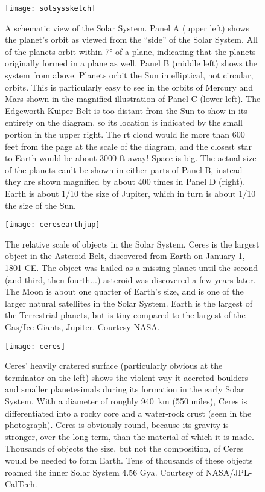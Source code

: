 \begin{figure}[p]
\centering
\texttt{[image: solsyssketch]}%
\caption{A schematic view of the Solar System. Panel A (upper left) shows the planet's orbit as viewed from the ``side'' of the Solar System. All of the planets orbit within \ang{7} of a plane, indicating that the planets originally formed in a plane as well. Panel B (middle left) shows the system from above. Planets orbit the Sun in elliptical, not circular, orbits. This is particularly easy to see in the orbits of Mercury and Mars shown in the magnified illustration of Panel C (lower left). The Edgeworth Kuiper Belt is too distant from the Sun to show in its entirety on the diagram, so its location is indicated by the small portion in the upper right. The rt cloud would lie more than 600 feet from the page at the scale of the diagram, and the closest star to Earth would be about 3000 ft away! Space is big. The actual size of the planets can't be shown in either parts of Panel B, instead they are shown magnified by about 400 times in Panel D (right). Earth is about 1/10 the size of Jupiter, which in turn is about 1/10 the size of the Sun.}  
\label{fig:solsys2}
\end{figure}

\begin{figure}[p]
\centering
\texttt{[image: ceresearthjup]}%
\caption{The relative scale of objects in the Solar System. Ceres is the largest object in the Asteroid Belt, discovered from Earth on January 1, 1801 CE. The object was hailed as a missing planet until the second (and third, then fourth...) asteroid was discovered a few years later. The Moon is about one quarter of Earth's size, and is one of the larger natural satellites in the Solar System. Earth is the largest of the Terrestrial planets, but is tiny compared to the largest of the Gas/Ice Giants, Jupiter. Courtesy NASA.}  
\label{fig:sizes}
\end{figure}

\begin{figure}[p]
\centering
\texttt{[image: ceres]}%
\caption{Ceres' heavily cratered surface (particularly obvious at the terminator on the left) shows the violent way it accreted boulders and smaller planetesimals during its formation in the early Solar System. With a diameter of roughly \SI{940}{\kilo\metre} (550 miles), Ceres is differentiated into a rocky core and a water-rock crust (seen in the photograph). Ceres is obviously round, because its gravity is stronger, over the long term, than the material of which it is made. Thousands of objects the size, but not the composition, of Ceres would be needed to form Earth. Tens of thousands of these objects roamed the inner Solar System 4.56 Gya. Courtesy of NASA/JPL-CalTech.}  
\label{fig:ceres}
\end{figure}


